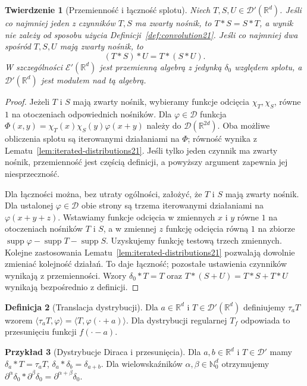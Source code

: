 \documentclass[11pt,a4paper]{article}
\numberwithin{equation}{section}
\theoremstyle{plain}
\newtheorem{twierdzenie}{Twierdzenie}[section]
\theoremstyle{definition}
\newtheorem{definicja}[twierdzenie]{Definicja}
\newtheorem{przyklad}[twierdzenie]{Przykład}
\theoremstyle{remark}
\newcommand{\R}{\mathbb R}
\newcommand{\N}{\mathbb N}
\DeclareMathOperator{\supp}{supp}
\begin{document}
\begin{twierdzenie}[Przemienność i łączność splotu]
\label{thm:convolution-algebra21}
Niech $T,S,U\in\mathcal D'(\R^d)$.
Jeśli co najmniej jeden z czynników $T,S$ ma zwarty nośnik,
to $T*S=S*T$, a wynik nie zależy od sposobu użycia
Definicji~\ref{def:convolution21}. Jeśli co najmniej dwa
spośród $T,S,U$ mają zwarty nośnik, to
\[
 (T*S)*U=T*(S*U).
\]
W szczególności $\mathcal E'(\R^d)$ jest przemienną
algebrą z jedynką $\delta_0$ względem splotu,
a $\mathcal D'(\R^d)$ jest modułem nad tą algebrą.
\end{twierdzenie}
\begin{proof}
Jeżeli $T$ i $S$ mają zwarty nośnik, wybieramy funkcje
odcięcia $\chi_T,\chi_S$, równe $1$ na otoczeniach
odpowiednich nośników. Dla $\varphi\in\mathcal D$ funkcja
$\Phi(x,y)=\chi_T(x)\chi_S(y)\varphi(x+y)$
należy do $\mathcal D(\R^{2d})$. Oba możliwe
obliczenia splotu są iterowanymi działaniami na $\Phi$;
równość wynika z Lematu~\ref{lem:iterated-distributions21}.
Jeśli tylko jeden czynnik ma zwarty nośnik,
przemienność jest częścią definicji, a powyższy
argument zapewnia jej niesprzeczność.

Dla łączności można, bez utraty ogólności, założyć,
że $T$ i $S$ mają zwarty nośnik. Dla ustalonej
$\varphi\in\mathcal D$ obie strony są trzema
iterowanymi działaniami na $\varphi(x+y+z)$.
Wstawiamy funkcje odcięcia w zmiennych $x$ i $y$
równe $1$ na otoczeniach nośników $T$ i $S$,
a w zmiennej $z$ funkcję odcięcia równą $1$
na zbiorze $\supp\varphi-\supp T-\supp S$.
Uzyskujemy funkcję testową trzech zmiennych.
Kolejne zastosowania Lematu~\ref{lem:iterated-distributions21}
pozwalają dowolnie zmieniać kolejność działań.
To daje łączność; pozostałe ustawienia czynników
wynikają z przemienności. Wzory
$\delta_0*T=T$ oraz $T*(S+U)=T*S+T*U$
wynikają bezpośrednio z definicji.
\end{proof}

\begin{definicja}[Translacja dystrybucji]
\label{def:translation21}
Dla $a\in\R^d$ i $T\in\mathcal D'(\R^d)$ definiujemy
$\tau_aT$ wzorem
$\langle\tau_aT,\varphi\rangle=
\langle T,\varphi(\cdot+a)\rangle$.
Dla dystrybucji regularnej $T_f$ odpowiada to
przesunięciu funkcji $f(\cdot-a)$.
\end{definicja}

\begin{przyklad}[Dystrybucje Diraca i przesunięcia]
\label{ex:delta-convolution21}
Dla $a,b\in\R^d$ i $T\in\mathcal D'$ mamy
$\delta_a*T=\tau_aT$, $\delta_a*\delta_b=\delta_{a+b}$.
Dla wielowskaźników $\alpha,\beta\in\N_0^d$ otrzymujemy
$\partial^\alpha\delta_0*\partial^\beta\delta_0
=\partial^{\alpha+\beta}\delta_0$.
\end{przyklad}
\end{document}
